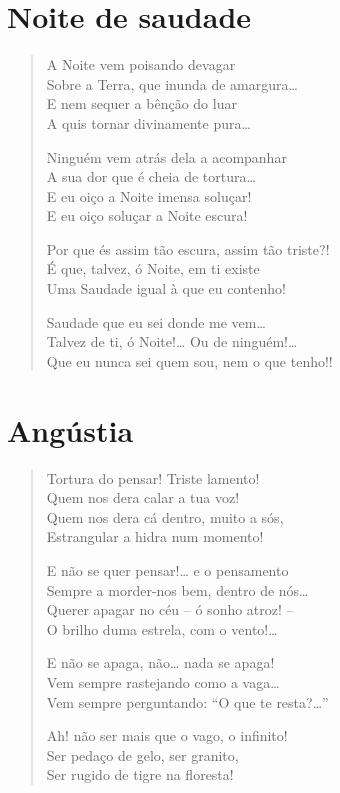 \chapter{Noite de saudade}

\begin{verse}
A Noite vem poisando devagar\\
Sobre a Terra, que inunda de amargura\ldots{}\\
E nem sequer a bênção do luar\\
A quis tornar divinamente pura\ldots{}

Ninguém vem atrás dela a acompanhar\\
A sua dor que é cheia de tortura\ldots{}\\
E eu oiço a Noite imensa soluçar!\\
E eu oiço soluçar a Noite escura!

Por que és assim tão escura, assim tão triste?!\\
É que, talvez, ó Noite, em ti existe\\
Uma Saudade igual à que eu contenho!

Saudade que eu sei donde me vem\ldots{}\\
Talvez de ti, ó Noite!\ldots{} Ou de ninguém!\ldots{}\\
Que eu nunca sei quem sou, nem o que tenho!! 
\end{verse}

\chapter{Angústia}

\begin{verse}Tortura do pensar! Triste lamento!\\
Quem nos dera calar a tua voz!\\
Quem nos dera cá dentro, muito a sós,\\
Estrangular a hidra num momento!

E não se quer pensar!\ldots{} e o pensamento\\
Sempre a morder-nos bem, dentro de nós\ldots{}\\
Querer apagar no céu – ó sonho atroz! – \\
O brilho duma estrela, com o vento!\ldots{}

E não se apaga, não\ldots{} nada se apaga!\\
Vem sempre rastejando como a vaga\ldots{}\\
Vem sempre perguntando: “O que te resta?\ldots{}” 

Ah! não ser mais que o vago, o infinito!\\
Ser pedaço de gelo, ser granito,\\
Ser rugido de tigre na floresta! 
\end{verse}

